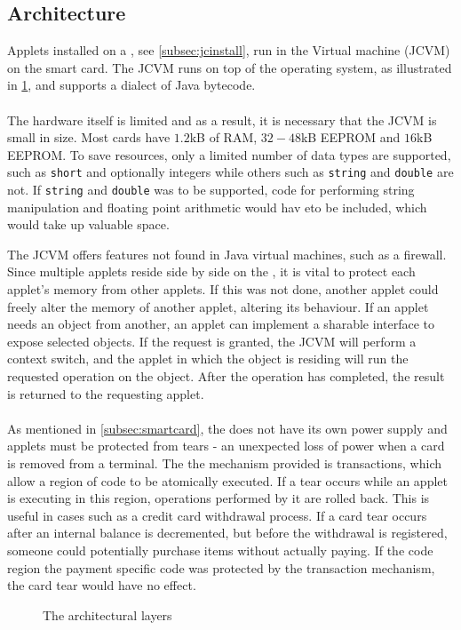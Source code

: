 \subsection{\jc Architecture}
Applets installed on a \jc, see \cref{subsec:jcinstall}, run in the \jc Virtual machine (JCVM) on the smart card. The JCVM runs on top of the operating system, as illustrated in \cref{fig:architecture},
and supports a dialect of Java bytecode.\\\\


The hardware itself is limited and as a result, it is necessary that the JCVM is small in size. Most cards have $1.2$kB of RAM, $32-48$kB EEPROM and $16$kB EEPROM. To save resources, only a limited number of data types are supported, such as \texttt{short} and optionally integers while others such as \texttt{string} and \texttt{double} are not. If \texttt{string} and \texttt{double} was to be supported, code for performing string manipulation and floating point arithmetic would hav eto be included, which would take up valuable space.

The JCVM offers features not found in Java virtual machines, such as a firewall. Since multiple applets reside side by side on the \jc, it is vital to protect each applet's memory from other applets. If this was not done, another applet could freely alter the memory of another applet, altering its behaviour. If an applet needs an object from another, an applet can implement a sharable interface to expose selected objects. If the request is granted, the JCVM will perform a context switch, and the applet in which the object is residing will run the requested operation on the object. After the operation has completed, the result is returned to the requesting applet.\\\\
As mentioned in \cref{subsec:smartcard}, the \jc does not have its own power supply and applets must be protected from tears - an unexpected loss of power when a card is removed from a terminal. The the mechanism provided is transactions, which allow a region of code to be atomically executed. If a tear occurs while an applet is executing in this region, operations performed by it are rolled back. This is useful in cases such as a credit card withdrawal process. If a card tear occurs after an internal balance is decremented, but before the withdrawal is registered, someone could potentially purchase items without actually paying. If the code region the payment specific code was protected by the transaction mechanism, the card tear would have no effect.



\begin{figure}[H]
\centering

\caption{The \jc architectural layers}
\label{fig:architecture}
\end{figure}